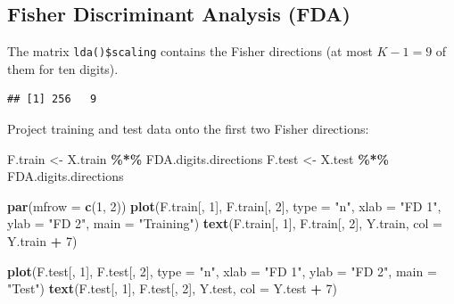 \documentclass[
]{book}
\newenvironment{Shaded}{\begin{snugshade}}{\end{snugshade}}
\newcommand{\AttributeTok}[1]{\textcolor[rgb]{0.13,0.29,0.53}{#1}}
\newcommand{\DecValTok}[1]{\textcolor[rgb]{0.00,0.00,0.81}{#1}}
\newcommand{\FunctionTok}[1]{\textcolor[rgb]{0.13,0.29,0.53}{\textbf{#1}}}
\newcommand{\NormalTok}[1]{#1}
\newcommand{\OtherTok}[1]{\textcolor[rgb]{0.56,0.35,0.01}{#1}}
\newcommand{\SpecialCharTok}[1]{\textcolor[rgb]{0.81,0.36,0.00}{\textbf{#1}}}
\newcommand{\StringTok}[1]{\textcolor[rgb]{0.31,0.60,0.02}{#1}}
\begin{document}
\subsection*{Fisher Discriminant Analysis (FDA)}\label{fisher-discriminant-analysis-fda-1}

The matrix \texttt{lda()\$scaling} contains the Fisher directions (at most \(K-1 = 9\) of them for ten digits).

\begin{Shaded}
\end{Shaded}

\begin{verbatim}
## [1] 256   9
\end{verbatim}

Project training and test data onto the first two Fisher directions:

\begin{Shaded}
\begin{Highlighting}[]
\NormalTok{F.train }\OtherTok{\textless{}{-}}\NormalTok{ X.train }\SpecialCharTok{\%*\%}\NormalTok{ FDA.digits.directions}
\NormalTok{F.test }\OtherTok{\textless{}{-}}\NormalTok{ X.test }\SpecialCharTok{\%*\%}\NormalTok{ FDA.digits.directions}

\FunctionTok{par}\NormalTok{(}\AttributeTok{mfrow =} \FunctionTok{c}\NormalTok{(}\DecValTok{1}\NormalTok{, }\DecValTok{2}\NormalTok{))}
\FunctionTok{plot}\NormalTok{(F.train[, }\DecValTok{1}\NormalTok{], F.train[, }\DecValTok{2}\NormalTok{], }\AttributeTok{type =} \StringTok{"n"}\NormalTok{, }\AttributeTok{xlab =} \StringTok{"FD 1"}\NormalTok{, }\AttributeTok{ylab =} \StringTok{"FD 2"}\NormalTok{,}
    \AttributeTok{main =} \StringTok{"Training"}\NormalTok{)}
\FunctionTok{text}\NormalTok{(F.train[, }\DecValTok{1}\NormalTok{], F.train[, }\DecValTok{2}\NormalTok{], Y.train, }\AttributeTok{col =}\NormalTok{ Y.train }\SpecialCharTok{+} \DecValTok{7}\NormalTok{)}

\FunctionTok{plot}\NormalTok{(F.test[, }\DecValTok{1}\NormalTok{], F.test[, }\DecValTok{2}\NormalTok{], }\AttributeTok{type =} \StringTok{"n"}\NormalTok{, }\AttributeTok{xlab =} \StringTok{"FD 1"}\NormalTok{, }\AttributeTok{ylab =} \StringTok{"FD 2"}\NormalTok{,}
    \AttributeTok{main =} \StringTok{"Test"}\NormalTok{)}
\FunctionTok{text}\NormalTok{(F.test[, }\DecValTok{1}\NormalTok{], F.test[, }\DecValTok{2}\NormalTok{], Y.test, }\AttributeTok{col =}\NormalTok{ Y.test }\SpecialCharTok{+} \DecValTok{7}\NormalTok{)}
\end{Highlighting}
\end{Shaded}
\end{document}
